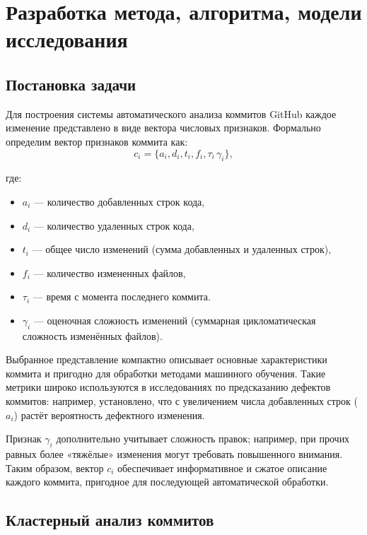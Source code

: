\chapter{Разработка метода, алгоритма, модели исследования} \label{ch2}

\section{Постановка задачи} \label{ch2:method_selection}

Для построения системы автоматического анализа коммитов GitHub каждое изменение представлено в виде вектора числовых признаков. Формально определим вектор признаков коммита как:
\begin{equation}
	c_i = \{a_i, d_i, t_i, f_i, \tau_i\, \gamma_i\},
\end{equation}

где:
\begin{itemize}
	\item \( a_i \) --- количество добавленных строк кода,
	\item \( d_i \) --- количество удаленных строк кода,
	\item \( t_i \) --- общее число изменений (сумма добавленных и удаленных строк),
	\item \( f_i \) --- количество измененных файлов,
	\item \( \tau_i \) --- время с момента последнего коммита.
	\item \( \gamma_i \) --- оценочная сложность изменений (суммарная цикломатическая сложность изменённых файлов).
\end{itemize}

Выбранное представление компактно описывает основные характеристики коммита и пригодно для обработки методами машинного обучения. Такие метрики широко используются в исследованиях по предсказанию дефектов коммитов: например, установлено, что с увеличением числа добавленных строк (\( a_i \)) растёт вероятность дефектного изменения.

Признак \( \gamma_i \) дополнительно учитывает сложность правок; например, при прочих равных более «тяжёлые» изменения могут требовать повышенного внимания. Таким образом, вектор \( c_i \) обеспечивает информативное и сжатое описание каждого коммита, пригодное для последующей автоматической обработки.

\section{Кластерный анализ коммитов} \label{ch2:problem_formulation}


